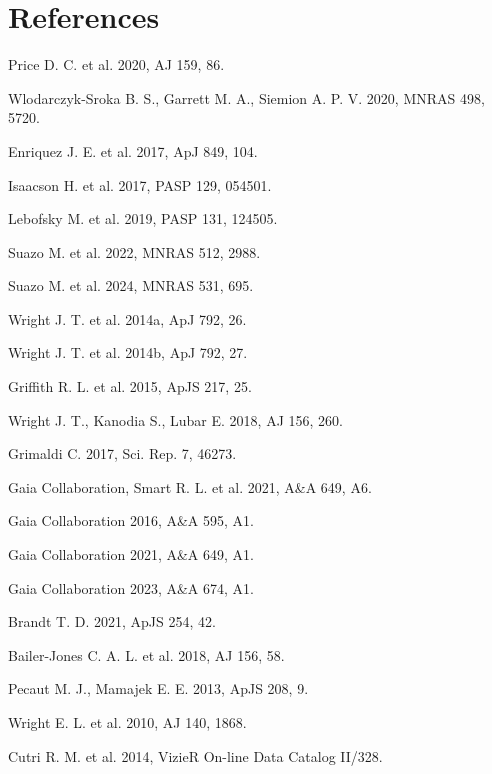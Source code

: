 \documentclass[11pt]{article}
\begin{document}
\section*{References}

\noindent [1] Price D. C. et al. 2020, AJ 159, 86.\par\smallskip
\noindent [2] Wlodarczyk-Sroka B. S., Garrett M. A., Siemion A. P. V. 2020, MNRAS 498, 5720.\par\smallskip
\noindent [3] Enriquez J. E. et al. 2017, ApJ 849, 104.\par\smallskip
\noindent [4] Isaacson H. et al. 2017, PASP 129, 054501.\par\smallskip
\noindent [5] Lebofsky M. et al. 2019, PASP 131, 124505.\par\smallskip
\noindent [6] Suazo M. et al. 2022, MNRAS 512, 2988.\par\smallskip
\noindent [7] Suazo M. et al. 2024, MNRAS 531, 695.\par\smallskip
\noindent [8] Wright J. T. et al. 2014a, ApJ 792, 26.\par\smallskip
\noindent [9] Wright J. T. et al. 2014b, ApJ 792, 27.\par\smallskip
\noindent [10] Griffith R. L. et al. 2015, ApJS 217, 25.\par\smallskip
\noindent [11] Wright J. T., Kanodia S., Lubar E. 2018, AJ 156, 260.\par\smallskip
\noindent [12] Grimaldi C. 2017, Sci. Rep. 7, 46273.\par\smallskip
\noindent [13] Gaia Collaboration, Smart R. L. et al. 2021, A\&A 649, A6.\par\smallskip
\noindent [14] Gaia Collaboration 2016, A\&A 595, A1.\par\smallskip
\noindent [15] Gaia Collaboration 2021, A\&A 649, A1.\par\smallskip
\noindent [16] Gaia Collaboration 2023, A\&A 674, A1.\par\smallskip
\noindent [17] Brandt T. D. 2021, ApJS 254, 42.\par\smallskip
\noindent [18] Bailer-Jones C. A. L. et al. 2018, AJ 156, 58.\par\smallskip
\noindent [19] Pecaut M. J., Mamajek E. E. 2013, ApJS 208, 9.\par\smallskip
\noindent [20] Wright E. L. et al. 2010, AJ 140, 1868.\par\smallskip
\noindent [21] Cutri R. M. et al. 2014, VizieR On-line Data Catalog II/328.\par\smallskip
\end{document}
